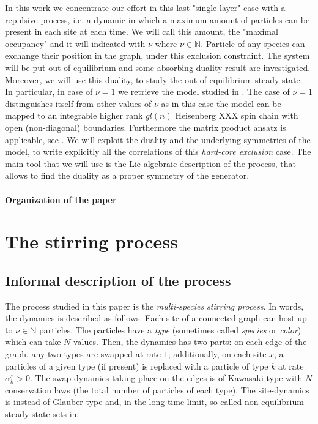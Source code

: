 \documentclass[10pt]{article}
\numberwithin{equation}{section}
\numberwithin{equation}{subsection}
\newcommand{\twoj}{\nu}
\begin{document}
In this work we concentrate our effort in this last "single layer" case with a repulsive process, i.e. a dynamic in which a maximum amount of particles can be present in each site at each time. We will call this amount, the "maximal occupancy" and it will indicated with $\twoj$ where $\twoj\in\mathbb{N}$. Particle of any species can exchange their position in the graph, under this exclusion constraint. The system will be put out of equilibrium and some absorbing duality result are investigated. Moreover, we will use this duality, to study the out of equilibrium steady state. In particular, in case of $\twoj=1$ we retrieve the model studied in \cite{vanicat2017exact}. 
{\color{red}
The case of $\twoj=1$ distinguishes itself from other values of $\twoj$ as in this case the model can be mapped to an integrable higher rank $gl(n)$ Heisenberg XXX spin chain with open (non-diagonal) boundaries. Furthermore the matrix product ansatz \cite{derrida1993exact}  is applicable, see \cite{Crampe:2014aoa,vanicat2017exact}.
}
We will exploit the duality and the underlying symmetries of the model, to write explicitly all the correlations of this \textit{hard-core exclusion} case. The main tool that we will use is the Lie algebraic description of the process, that allows to find the duality as a proper symmetry of the generator. 
\paragraph{Organization of the paper}
\section{The stirring process}
\subsection{Informal description of the process}
The process studied in this paper is the {\em multi-species stirring process}. 
In words, the dynamics is described as follows. Each site
of a connected graph can host up to $\nu\in \mathbb{N}$ particles.
The particles have a {\em type} (sometimes called {\em species} or {\em color})
which can take $N$ values.
Then, the dynamics has two parts: on each edge of the graph, 
any two types are swapped at rate $1$; additionally, on each site $x$, 
a particles of a given type (if present) is replaced with a
particle of type $k$ at rate $\alpha_k^x >0$.
The swap dynamics taking place on the edges is of Kawasaki-type 
with $N$ conservation laws
(the total number of particles of each type). 
The site-dynamics is instead of Glauber-type 
and, in the long-time limit, so-called non-equilibrium
steady state sets in.
\end{document}
